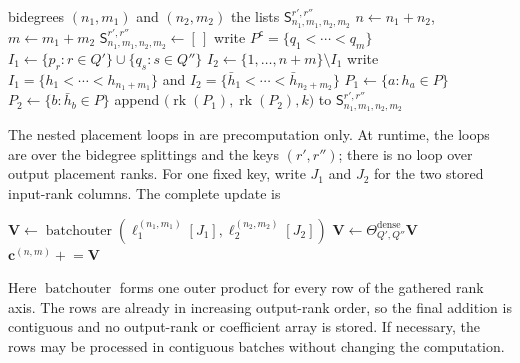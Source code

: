 \documentclass{amsart}
\theoremstyle{definition}
\theoremstyle{remark}
\begin{document}
\begin{algorithm}[ht]
\caption{Placement-rank lists for the shuffle}
\label{alg:shuffle_placement_arrays}
\begin{algorithmic}[1]
\Require bidegrees $(n_1,m_1)$ and $(n_2,m_2)$
\Ensure the lists
$\mathsf{S}^{r',r''}_{n_1,m_1,n_2,m_2}$
\State $n\gets n_1+n_2$, $m\gets m_1+m_2$
        \State
        $\mathsf{S}^{r',r''}_{n_1,m_1,n_2,m_2}\gets[\,]$
    \EndFor
\EndFor
{}
    \State write
    $P^{\mathsf c}=\{q_1<\cdots<q_m\}$
            \State
            $I_1\gets
            \{p_r:r\in Q'\}
            \cup
            \{q_s:s\in Q''\}$
            \State
            $I_2\gets
            \{1,\ldots,n+m\}\setminus I_1$
            \State write
            $I_1=\{h_1<\cdots<h_{n_1+m_1}\}$ and
            $I_2=\{\bar h_1<\cdots<\bar h_{n_2+m_2}\}$
            \State
            $P_1\gets\{a:h_a\in P\}$
            \State
            $P_2\gets\{b:\bar h_b\in P\}$
            \State append
            $\bigl(
                \operatorname{rk}(P_1),
                \operatorname{rk}(P_2),
                k
            \bigr)$
            to
            $\mathsf{S}^{r',r''}_{n_1,m_1,n_2,m_2}$
        \EndFor
    \EndFor
\EndFor
\end{algorithmic}
\end{algorithm}

\begin{implrmk}
The nested placement loops in
 are precomputation only. At runtime,
the loops are over the bidegree splittings and the keys $(r',r'')$; there
is no loop over output placement ranks. For one fixed key, write $J_1$ and
$J_2$ for the two stored input-rank columns. The complete update is
\begin{algorithmic}[1]
\State $\mathbf{V}\gets
    \operatorname{batchouter}
    \left(
        \ell_1^{(n_1,m_1)}[J_1],
        \ell_2^{(n_2,m_2)}[J_2]
    \right)$
\State $\mathbf{V}\gets
    \Theta^{\mathrm{dense}}_{Q',Q''}\mathbf{V}$
\State $\mathbf{c}^{(n,m)}\mathrel{+}=\mathbf{V}$
\end{algorithmic}
Here $\operatorname{batchouter}$ forms one outer product for every row of
the gathered rank axis. The rows are already in increasing output-rank
order, so the final addition is contiguous and no output-rank or
coefficient array is stored. If necessary, the rows may be processed in
contiguous batches without changing the computation.
\end{implrmk}
\end{document}
